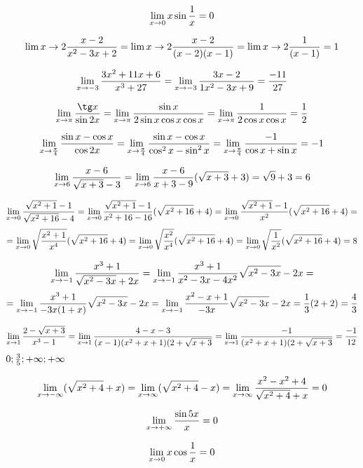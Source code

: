 
\BeginDoc{}
\def\posloup{$\zs{a_n}_{n=1}^{\infty}$}
\def\pos#1{\zs{#1}_{n=1}^{\infty}}
\def\li{\lim_{n\rightarrow\infty}}
\def\lix{\lim_{x\rightarrow x_0}}
\def\r{\rightarrow}
\def\sup{{\rm sup\ }}
\def\sciwinfup{{\rm inf\ }}
\def\su{\sum_{n=1}^{\infty}}
\Pr
$$\lim_{x\r 0} x\sin\f1x = 0$$

\Pr
$$
\lim{x\r 2} \f{x-2}{x^2-3x+2}
=
\lim{x\r 2} \f{x-2}{(x-2)(x-1)}
=
\lim{x\r 2} \f{1}{(x-1)}
= 1
$$

$$
\lim_{x\r -3} \f{3x^2+11x+6}{x^3+27}
=
\lim_{x\r -3} \f{3x-2}{1x^2-3x+9} =\f{-11}{27}
$$

$$
\lim_{x\r \pi} \f{\tg x}{\sin 2x} 
=
\lim_{x\r \pi} \f{\sin x}{2\sin x \cos x \cos x} 
=
\lim_{x\r \pi} \f{1}{2\cos x \cos x} = \f 12
$$

$$
\lim_{x\r\f\pi4} \f{\sin x-\cos x}{\cos 2x}
=
\lim_{x\r\f\pi4} \f{\sin x-\cos x}{\cos^2 x-\sin^2 x}
=
\lim_{x\r\f\pi4} \f{-1}{\cos x+\sin x}
=
-1
$$

\Pr
$$
\lim_{x\r6} \f{x-6}{\sqrt{x+3}-3}
=
\lim_{x\r6} \f{x-6}{x+3-9} (\sqrt{x+3}+3)
=
\sqrt{9} + 3
=
6
$$

$$
\lim_{x\r 0} \f{\sqrt{x^2+1}-1}{\sqrt{x^2+16}-4}
=
\lim_{x\r 0} \f{\sqrt{x^2+1}-1}{x^2+16-16}(\sqrt{x^2+16}+4)
=
\lim_{x\r 0} \f{\sqrt{x^2+1}-1}{x^2}(\sqrt{x^2+16}+4)
=$$$$=
\lim_{x\r 0} \sqrt{\f{x^2+1}{x^4}}(\sqrt{x^2+16}+4)
=
\lim_{x\r 0} \sqrt{\f{x^2}{x^4}}(\sqrt{x^2+16}+4)
=
\lim_{x\r 0} \sqrt{\f{1}{x^2}}(\sqrt{x^2+16}+4)
=8
$$

$$
\lim_{x\r -1}\f{x^3+1}{\sqrt{x^2-3x}+2x}
=
\lim_{x\r -1}\f{x^3+1}{x^2-3x-4x^2}\*\sqrt{x^2-3x}-2x
=$$$$=
\lim_{x\r -1}\f{x^3+1}{-3x(1+x)}\*\sqrt{x^2-3x}-2x
=
\lim_{x\r -1}\f{x^2-x+1}{-3x}\*\sqrt{x^2-3x}-2x
=
\f{1}3(2+2)=\f 43
$$

$$
\lim_{x\r 1} \f{2-\sqrt{x+3}}{x^3-1}
=
\lim_{x\r 1} \f{4-x-3}{(x-1)(x^2+x+1)(2+\sqrt{x+3}}
=
\lim_{x\r 1} \f{-1}{(x^2+x+1)(2+\sqrt{x+3}}
=
\f{-1}{12}
$$
\Pr
$0;\frac 3 5 ; +\infty;+\infty$
\Pr

\Pr
$$
\lim_{x\r-\infty} (\sqrt{x^2+4}+x)
=
\lim_{x\r\infty} (\sqrt{x^2+4}-x)
=
\lim_{x\r\infty} \f{x^2-x^2+4}{\sqrt{x^2+4}+x}
=0
$$

\Pr
$$\lim_{x\r+\infty} \f{\sin 5x}{x} =0$$

$$\lim_{x\r0} x\cos \f  1 x = 0$$


\EndDoc
